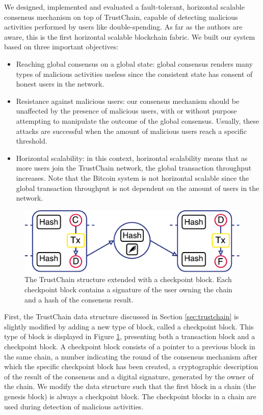 \documentclass[USenglish]{article}
\begin{document}
We designed, implemented and evaluated a fault-tolerant, horizontal scalable consensus mechanism on top of TrustChain, capable of detecting malicious activities performed by users like double-spending.
As far as the authors are aware, this is the first horizontal scalable blockchain fabric.
We built our system based on three important objectives:
\begin{itemize}
	\item Reaching global consensus on a global state: global consensus renders many types of malicious activities useless since the consistent state has consent of honest users in the network.
	\item Resistance against malicious users: our consensus mechanism should be unaffected by the presence of malicious users, with or without purpose attempting to manipulate the outcome of the global consensus. Usually, these attacks are successful when the amount of malicious users reach a specific threshold.
	\item Horizontal scalability: in this context, horizontal scalability means that as more users join the TrustChain network, the global transaction throughput increases. Note that the Bitcoin system is not horizontal scalable since the global transaction throughput is not dependent on the amount of users in the network.
\end{itemize}

\begin{figure}[t]
	\centering
	\includegraphics[width=0.8\columnwidth]{assets/trustchain_cp}
	\caption{The TrustChain structure extended with a checkpoint block. Each checkpoint block contains a signature of the user owning the chain and a hash of the consensus result.}
	\label{fig:trustchain_cp}
\end{figure}

First, the TrustChain data structure discussed in Section \ref{sec:trustchain} is slightly modified by adding a new type of block, called a checkpoint block.
This type of block is displayed in Figure \ref{fig:trustchain_cp}, presenting both a transaction block and a checkpoint block.
A checkpoint block consists of a pointer to a previous block in the same chain, a number indicating the round of the consensus mechanism after which the specific checkpoint block has been created, a cryptographic description of the result of the consensus and a digital signature, generated by the owner of the chain.
We modify the data structure such that the first block in a chain (the genesis block) is always a checkpoint block.
The checkpoint blocks in a chain are used during detection of malicious activities.
\end{document}
